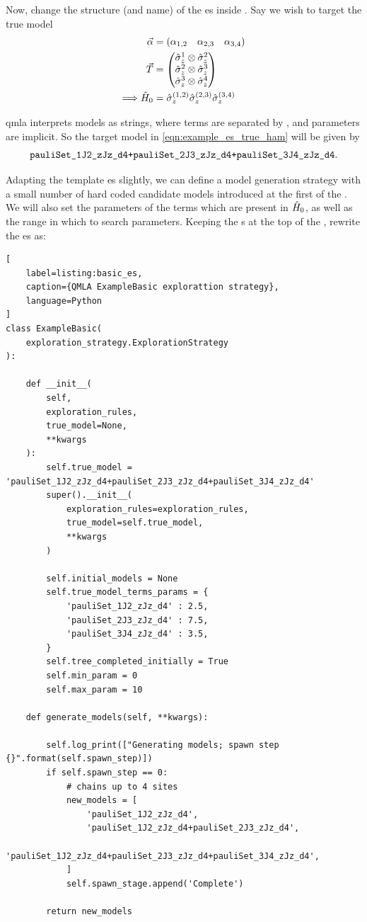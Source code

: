 Now, change the structure (and name) of the \gls{es} inside . 
Say we wish to target the true model 
\begin{equation}
    \label{eqn:example_es_true_ham}
    \begin{split}
        \vec{\alpha} &= \begin{matrix}( \alpha_{1,2} & \alpha_{2,3} & \alpha_{3,4})\end{matrix} \\
        { \vec{T} } &= \left(\begin{matrix} \hat{\sigma}_{z}^1 \otimes \hat{\sigma}_{z}^2 \\ \hat{\sigma}_{z}^2 \otimes \hat{\sigma}_{z}^3  \\ \hat{\sigma}_{z}^3 \otimes \hat{\sigma}_{z}^4 \end{matrix}\right) \\
        \Longrightarrow \hat{H}_0 &= \hat{\sigma}_{z}^{(1,2)} \hat{\sigma}_{z}^{(2,3)} \hat{\sigma}_{z}^{(3,4)} \\
    \end{split}
\end{equation}

\gls{qmla} interprets models as strings, where terms are separated by \ttt{+}, and parameters are implicit. 
So the target model in \cref{eqn:example_es_true_ham} will be given by 
$$ \texttt{pauliSet\_1J2\_zJz\_d4+pauliSet\_2J3\_zJz\_d4+pauliSet\_3J4\_zJz\_d4}. $$

Adapting the template \gls{es} slightly, we can define a model generation strategy with a small number of hard coded 
    candidate models introduced at the first of the . 
We will also set the parameters of the terms which are present in $\hat{H}_0$, as well as the range in which to search parameters.
Keeping the s at the top of the , rewrite the \gls{es} as: 

\begin{lstlisting}[
    label=listing:basic_es,
    caption={QMLA ExampleBasic explorattion strategy},
    language=Python
]
class ExampleBasic(
    exploration_strategy.ExplorationStrategy
):

    def __init__(
        self,
        exploration_rules,
        true_model=None,
        **kwargs
    ):
        self.true_model = 'pauliSet_1J2_zJz_d4+pauliSet_2J3_zJz_d4+pauliSet_3J4_zJz_d4'
        super().__init__(
            exploration_rules=exploration_rules,
            true_model=self.true_model,
            **kwargs
        )

        self.initial_models = None
        self.true_model_terms_params = {
            'pauliSet_1J2_zJz_d4' : 2.5,
            'pauliSet_2J3_zJz_d4' : 7.5,
            'pauliSet_3J4_zJz_d4' : 3.5,
        }
        self.tree_completed_initially = True
        self.min_param = 0
        self.max_param = 10

    def generate_models(self, **kwargs):

        self.log_print(["Generating models; spawn step {}".format(self.spawn_step)])
        if self.spawn_step == 0:
            # chains up to 4 sites
            new_models = [
                'pauliSet_1J2_zJz_d4',
                'pauliSet_1J2_zJz_d4+pauliSet_2J3_zJz_d4',
                'pauliSet_1J2_zJz_d4+pauliSet_2J3_zJz_d4+pauliSet_3J4_zJz_d4',
            ]
            self.spawn_stage.append('Complete')

        return new_models

\end{lstlisting}


